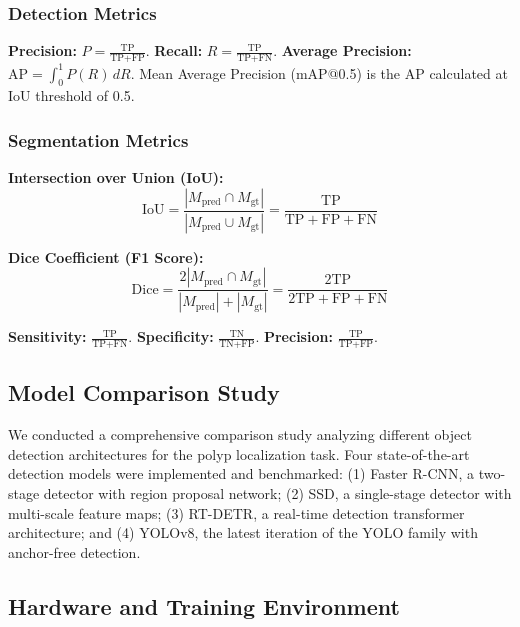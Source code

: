 \documentclass[conference]{IEEEtran}
\begin{document}
\subsubsection{Detection Metrics}
\textbf{Precision:} $P = \frac{\text{TP}}{\text{TP} + \text{FP}}$. \textbf{Recall:} $R = \frac{\text{TP}}{\text{TP} + \text{FN}}$. \textbf{Average Precision:} $\text{AP} = \int_0^1 P(R)\,dR$. Mean Average Precision (mAP@0.5) is the AP calculated at IoU threshold of 0.5.

\subsubsection{Segmentation Metrics}
\textbf{Intersection over Union (IoU):}
\begin{equation}
    \text{IoU} = \frac{|M_{\text{pred}} \cap M_{\text{gt}}|}{|M_{\text{pred}} \cup M_{\text{gt}}|} = \frac{\text{TP}}{\text{TP} + \text{FP} + \text{FN}}
\end{equation}

\textbf{Dice Coefficient (F1 Score):}
\begin{equation}
    \text{Dice} = \frac{2|M_{\text{pred}} \cap M_{\text{gt}}|}{|M_{\text{pred}}| + |M_{\text{gt}}|} = \frac{2\text{TP}}{2\text{TP} + \text{FP} + \text{FN}}
\end{equation}

\textbf{Sensitivity:} $\frac{\text{TP}}{\text{TP} + \text{FN}}$. \textbf{Specificity:} $\frac{\text{TN}}{\text{TN} + \text{FP}}$. \textbf{Precision:} $\frac{\text{TP}}{\text{TP} + \text{FP}}$.

\subsection{Model Comparison Study}

We conducted a comprehensive comparison study analyzing different object detection architectures for the polyp localization task. Four state-of-the-art detection models were implemented and benchmarked: (1) Faster R-CNN, a two-stage detector with region proposal network; (2) SSD, a single-stage detector with multi-scale feature maps; (3) RT-DETR, a real-time detection transformer architecture; and (4) YOLOv8, the latest iteration of the YOLO family with anchor-free detection.

\subsection{Hardware and Training Environment}
\end{document}
